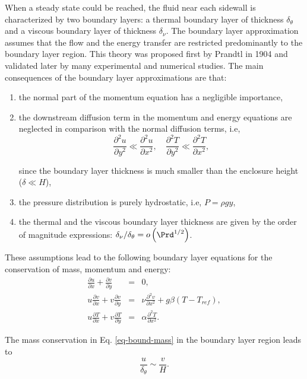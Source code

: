 When a steady state could be reached, the fluid near each sidewall is characterized by two boundary layers: a thermal boundary layer of thickness $\delta_{\theta}$ and a viscous boundary layer of thickness $\delta_\nu$.
The boundary layer approximation assumes that the flow and the energy transfer are restricted predominantly to the boundary layer region.
This theory was proposed first by Prandtl in 1904 and validated later by many experimental and numerical studies.
The main consequences of the boundary layer approximations are that:
\begin{enumerate}[label=(\roman*)]
\item the normal part of the momentum equation has a negligible importance,
\item the downstream diffusion term in the momentum and energy equations are neglected in comparison with the normal diffusion terms, i.e,
\begin{equation}
	\frac{\partial^2 u}{\partial y^2}  \ll  \frac{\partial^2 u}{\partial x^2}, \quad \frac{\partial^2 T}{\partial y^2}  \ll  \frac{\partial^2 T}{\partial x^2},
\end{equation}

\noindent since the boundary layer thickness is much smaller than the enclosure height ($ \delta \ll H$),
\item the pressure distribution is purely hydrostatic, i.e, $P = \rho g y$,
\item the thermal and the viscous boundary layer thickness are given by the order of magnitude expressions: $\delta_\nu/\delta_\theta = o \left(\Prd^{1/2} \right)$.
\end{enumerate}
These assumptions lead to the following boundary layer equations for the conservation of mass, momentum and energy:
\begin{eqnarray} \label{eq-bound-mass}
	\frac{\partial u}{\partial x} + \frac{\partial v}{\partial y} &=& 0, \\  \label{eq-bound-mom}
	u \frac{\partial v}{\partial x} + v \frac{\partial v}{\partial y} &=& \nu \frac{\partial^2 v}{\partial x^2} + g \beta (T - T_{ref}), \\ \label{eq-bound-energy-1}
	u \frac{\partial T}{\partial x} + v \frac{\partial T}{\partial y} &=& \alpha \frac{\partial^2 T}{\partial x^2}. 
\end{eqnarray}

\noindent The mass conservation in Eq. \ref{eq-bound-mass} in the boundary layer region leads to
\begin{equation}
	\frac{u}{\delta_\theta} \sim \frac{v}{H}.
\end{equation}


